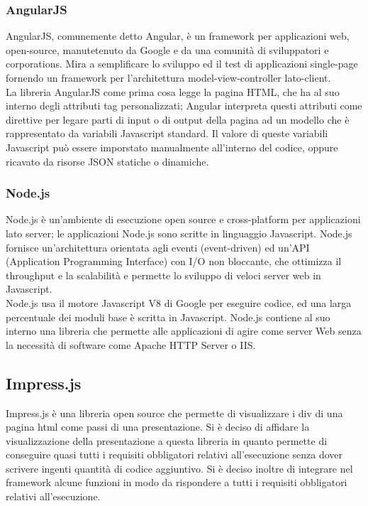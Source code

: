 	\subsubsection{AngularJS}{
		AngularJS, comunemente detto Angular, è un framework per applicazioni web, open-source, manutetenuto da Google e da una comunità di sviluppatori e corporations. Mira a semplificare lo sviluppo ed il test di applicazioni single-page fornendo un framework per l'architettura model-view-controller lato-client. \\
		La libreria AngularJS come prima cosa legge la pagina HTML, che ha al suo interno degli attributi tag personalizzati; Angular interpreta questi attributi come direttive per legare parti di input o di output della pagina ad un modello che è rappresentato da variabili Javascript standard. Il valore di queste variabili Javascript può essere imporstato manualmente all'interno del codice, oppure ricavato da risorse JSON statiche o dinamiche.
	}
	\subsubsection{Node.js}{
		Node.js è un'ambiente di esecuzione open source e cross-platform per applicazioni lato server; le applicazioni Node.js sono scritte in linguaggio Javascript. Node.js fornisce un'architettura orientata agli eventi (event-driven) ed un'API (Application Programming Interface) con I/O non bloccante, che ottimizza il throughput e la scalabilità e permette lo sviluppo di veloci server web in Javascript. \\
		Node.js usa il motore Javascript V8 di Google per eseguire codice, ed una larga percentuale dei moduli base è scritta in Javascript. Node.js contiene al suo interno una libreria che permette alle applicazioni di agire come server Web senza la necessità di software come Apache HTTP Server o IIS.
	}
	\subsection{Impress.js}{
		Impress.js è una libreria open source che permette di visualizzare i div di una pagina html come passi di una presentazione. Si è deciso di affidare la visualizzazione della presentazione a questa libreria in quanto permette di conseguire quasi tutti i requisiti obbligatori relativi all’esecuzione senza dover scrivere ingenti quantità di codice aggiuntivo.
		Si è deciso inoltre di integrare nel framework alcune funzioni in modo da rispondere a tutti i requisiti obbligatori relativi all’esecuzione.
	}